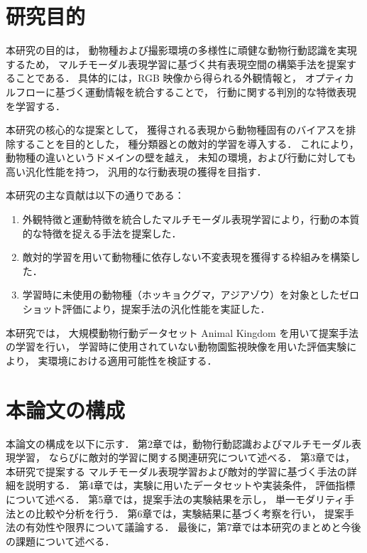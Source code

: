 \section{研究目的}
本研究の目的は，
動物種および撮影環境の多様性に頑健な動物行動認識を実現するため，
マルチモーダル表現学習に基づく共有表現空間の構築手法を提案することである．
具体的には，RGB 映像から得られる外観情報と，
オプティカルフローに基づく運動情報を統合することで，
行動に関する判別的な特徴表現を学習する．

本研究の核心的な提案として，
獲得される表現から動物種固有のバイアスを排除することを目的とした，
種分類器との敵対的学習を導入する．
これにより，動物種の違いというドメインの壁を越え，
未知の環境，および行動に対しても高い汎化性能を持つ，
汎用的な行動表現の獲得を目指す．

本研究の主な貢献は以下の通りである：
\begin{enumerate}
  \item 外観特徴と運動特徴を統合したマルチモーダル表現学習により，行動の本質的な特徴を捉える手法を提案した．
  \item 敵対的学習を用いて動物種に依存しない不変表現を獲得する枠組みを構築した．
  \item 学習時に未使用の動物種（ホッキョクグマ，アジアゾウ）を対象としたゼロショット評価により，提案手法の汎化性能を実証した．
\end{enumerate}

本研究では，
大規模動物行動データセット Animal Kingdom \cite{ng2022animal} を用いて提案手法の学習を行い，
学習時に使用されていない動物園監視映像を用いた評価実験により，
実環境における適用可能性を検証する．

\section{本論文の構成}

本論文の構成を以下に示す．
第2章では，動物行動認識およびマルチモーダル表現学習，
ならびに敵対的学習に関する関連研究について述べる．
第3章では，本研究で提案する
マルチモーダル表現学習および敵対的学習に基づく手法の詳細を説明する．
第4章では，実験に用いたデータセットや実装条件，
評価指標について述べる．
第5章では，提案手法の実験結果を示し，
単一モダリティ手法との比較や分析を行う．
第6章では，実験結果に基づく考察を行い，
提案手法の有効性や限界について議論する．
最後に，第7章では本研究のまとめと今後の課題について述べる．